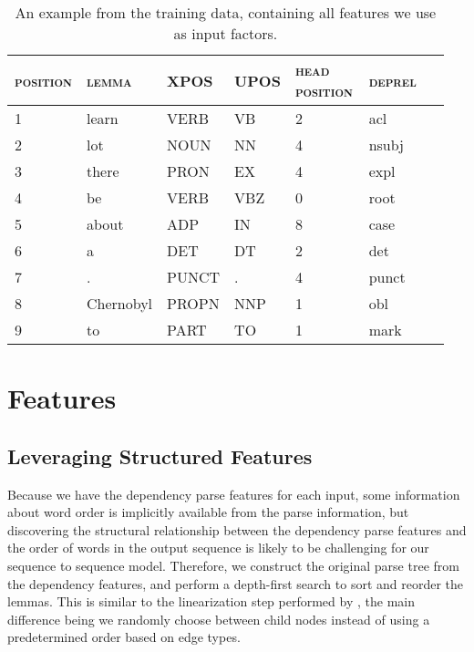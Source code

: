 \documentclass[11pt,a4paper]{article}
\begin{document}
\begin{table*}[ht!]
\centering
\begin{tabular}{p{0.1\linewidth}p{0.15\linewidth}p{0.15\linewidth}p{0.1\linewidth}p{0.2\linewidth}p{0.1\linewidth}p{0.15\linewidth}}
\toprule
 \textsc{position} & \textsc{lemma} & \textsc{XPOS} & \textsc{UPOS} & \textsc{head position} & \textsc{deprel} \\ \midrule
 1 & learn & VERB & VB & 2 & acl \\
 2 & lot & NOUN & NN & 4 & nsubj \\
 3 & there & PRON & EX & 4 & expl \\
 4 & be & VERB & VBZ & 0 & root \\
 5 & about & ADP & IN & 8 & case \\
 6 & a & DET & DT & 2 & det \\
 7 & . & PUNCT & . & 4 & punct \\
 8 & Chernobyl & PROPN & NNP & 1 & obl \\
 9 & to & PART & TO & 1 & mark \\
\bottomrule
\end{tabular}
\caption{An example from the training data, containing all features we use as input factors.}
\label{tab:input-data-example}
\end{table*}

\section{Features}

\subsection{Leveraging Structured Features}

Because we have the dependency parse features for each input, some information about word order is implicitly available from the parse information, but discovering the structural relationship between the dependency parse features and the order of words in the output sequence is likely to be challenging for our sequence to sequence model. Therefore, we construct the original parse tree from the dependency features, and perform a depth-first search to sort and reorder the lemmas. This is similar to the linearization step performed by \citet{Konstas2017NeuralGeneration}, the main difference being we randomly choose between child nodes instead of using a predetermined order based on edge types.
\end{document}
